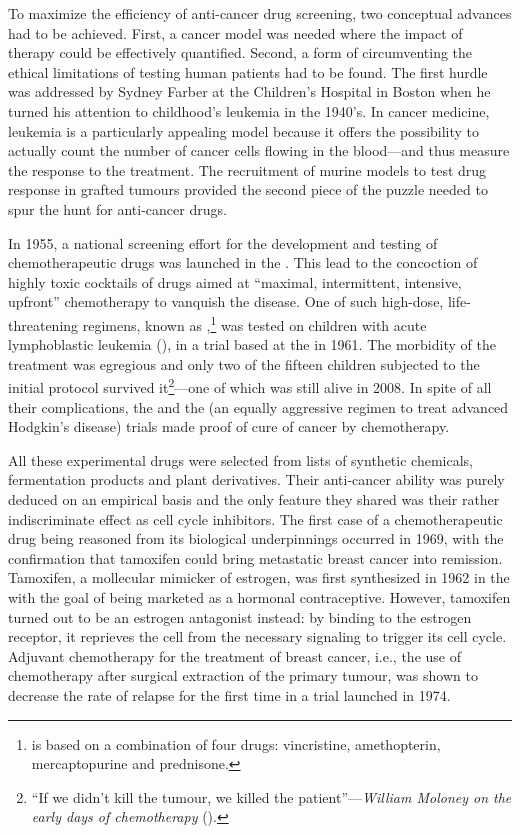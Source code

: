 To maximize the efficiency of anti-cancer drug screening, two conceptual
advances had to be achieved.  First, a cancer model was needed where the impact
of therapy could be effectively quantified.  Second, a form of circumventing the
ethical limitations of testing human patients had to be found.  The first hurdle
was addressed by Sydney Farber at the Children's Hospital in Boston when he
turned his attention to childhood's leukemia in the 1940's.  In cancer medicine,
leukemia is a particularly appealing model because it offers the possibility to
actually count the number of cancer cells flowing in the blood---and thus
measure the response to the treatment.  The recruitment of murine models to test
drug response in grafted tumours provided the second piece of the puzzle needed
to spur the hunt for anti-cancer drugs.\cite{clowes_further_1905}

In 1955, a national screening effort for the development and testing of
chemotherapeutic drugs was launched in the .  This lead to the
concoction of highly toxic cocktails of drugs aimed at ``maximal, intermittent,
intensive, upfront'' chemotherapy to vanquish the
disease.\cite{frei_curative_1985} One of such high-dose, life-threatening
regimens, known as ,\footnote{ is based on a
  combination of four drugs: vincristine, amethopterin, mercaptopurine and
  prednisone.} was tested on children with acute lymphoblastic leukemia
(), in a trial based at the  in 1961.  The
morbidity of the treatment was egregious and only two of the fifteen children
subjected to the initial protocol survived it\footnote{``If we didn't kill the
  tumour, we killed the patient''---\emph{William Moloney on the early days of
    chemotherapy} (\citealp{moloney_pioneering_1997}).}---one of which was still
alive in 2008.\cite{mukherjee_emperor_2011} In spite of all their complications,
the \cite{frei_effectiveness_1965} and the
\cite{devita_combination_1970} (an equally aggressive regimen to
treat advanced Hodgkin's disease) trials made proof of cure of cancer by
chemotherapy.

All these experimental drugs were selected from lists of synthetic chemicals,
fermentation products and plant derivatives.  Their anti-cancer ability was
purely deduced on an empirical basis and the only feature they shared was their
rather indiscriminate effect as cell cycle inhibitors.  The first case of a
chemotherapeutic drug being reasoned from its biological underpinnings occurred
in 1969, with the confirmation that tamoxifen could bring metastatic breast
cancer into remission.\cite{cole_new_1971} Tamoxifen, a mollecular mimicker of
estrogen, was first synthesized in 1962 in the  with the goal of
being marketed as a hormonal contraceptive.  However, tamoxifen turned out to be
an estrogen antagonist instead: by binding to the estrogen receptor, it
reprieves the cell from the necessary signaling to trigger its cell cycle.
Adjuvant chemotherapy for the treatment of breast cancer, i.e., the use of
chemotherapy after surgical extraction of the primary tumour, was shown to
decrease the rate of relapse for the first time in a trial launched in
1974.\cite{bonadonna_combination_1976}

